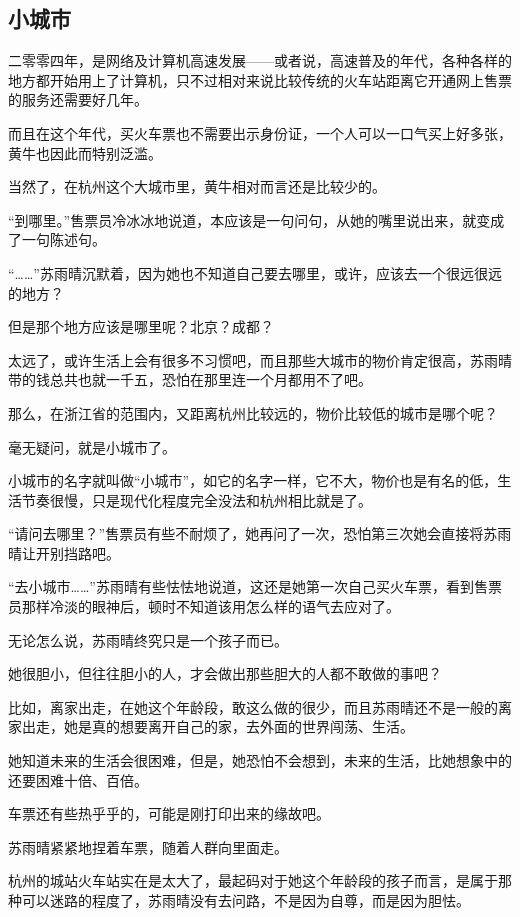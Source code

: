 \subsection{小城市}

二零零四年，是网络及计算机高速发展——或者说，高速普及的年代，各种各样的地方都开始用上了计算机，只不过相对来说比较传统的火车站距离它开通网上售票的服务还需要好几年。

而且在这个年代，买火车票也不需要出示身份证，一个人可以一口气买上好多张，黄牛也因此而特别泛滥。

当然了，在杭州这个大城市里，黄牛相对而言还是比较少的。

“到哪里。”售票员冷冰冰地说道，本应该是一句问句，从她的嘴里说出来，就变成了一句陈述句。

“……”苏雨晴沉默着，因为她也不知道自己要去哪里，或许，应该去一个很远很远的地方？

但是那个地方应该是哪里呢？北京？成都？

太远了，或许生活上会有很多不习惯吧，而且那些大城市的物价肯定很高，苏雨晴带的钱总共也就一千五，恐怕在那里连一个月都用不了吧。

那么，在浙江省的范围内，又距离杭州比较远的，物价比较低的城市是哪个呢？

毫无疑问，就是小城市了。

小城市的名字就叫做“小城市”，如它的名字一样，它不大，物价也是有名的低，生活节奏很慢，只是现代化程度完全没法和杭州相比就是了。

“请问去哪里？”售票员有些不耐烦了，她再问了一次，恐怕第三次她会直接将苏雨晴让开别挡路吧。

“去小城市……”苏雨晴有些怯怯地说道，这还是她第一次自己买火车票，看到售票员那样冷淡的眼神后，顿时不知道该用怎么样的语气去应对了。

无论怎么说，苏雨晴终究只是一个孩子而已。

她很胆小，但往往胆小的人，才会做出那些胆大的人都不敢做的事吧？

比如，离家出走，在她这个年龄段，敢这么做的很少，而且苏雨晴还不是一般的离家出走，她是真的想要离开自己的家，去外面的世界闯荡、生活。

她知道未来的生活会很困难，但是，她恐怕不会想到，未来的生活，比她想象中的还要困难十倍、百倍。

车票还有些热乎乎的，可能是刚打印出来的缘故吧。

苏雨晴紧紧地捏着车票，随着人群向里面走。

杭州的城站火车站实在是太大了，最起码对于她这个年龄段的孩子而言，是属于那种可以迷路的程度了，苏雨晴没有去问路，不是因为自尊，而是因为胆怯。


